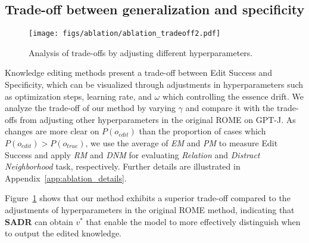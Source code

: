 \subsection{Trade-off between generalization and specificity}
\label{subsec:tradeoff}
\begin{figure}[htbp]
  \centering
  \texttt{[image: figs/ablation/ablation\_tradeoff2.pdf]}
  \caption{Analysis of trade-offs by adjusting different hyperparameters.}
  \label{fig:tradeoff}
\end{figure}

Knowledge editing methods present a trade-off between Edit Success and Specificity, which can be visualized through adjustments in hyperparameters such as optimization steps, learning rate, and $\omega$ which controlling the essence drift. %
We analyze the trade-off of our method by varying $\gamma$ and compare it with the trade-offs from adjusting other hyperparameters in the original ROME on GPT-J.
As changes are more clear on $P(o_{edit})$ than the proportion of cases which $P(o_{edit}) > P(o_{true})$, we use the average of \textit{EM} and \textit{PM} to measure Edit Success and apply \textit{RM} and \textit{DNM} for evaluating \textit{Relation} and \textit{Distract Neighborhood} task, respectively.
Further details are illustrated in Appendix~\ref{app:ablation_details}.

Figure~\ref{fig:tradeoff} shows that our method exhibits a superior trade-off compared to the adjustments of hyperparameters in the original ROME method, indicating that \textbf{SADR} can obtain $v^*$ that enable the model to more effectively distinguish when to output the edited knowledge.


